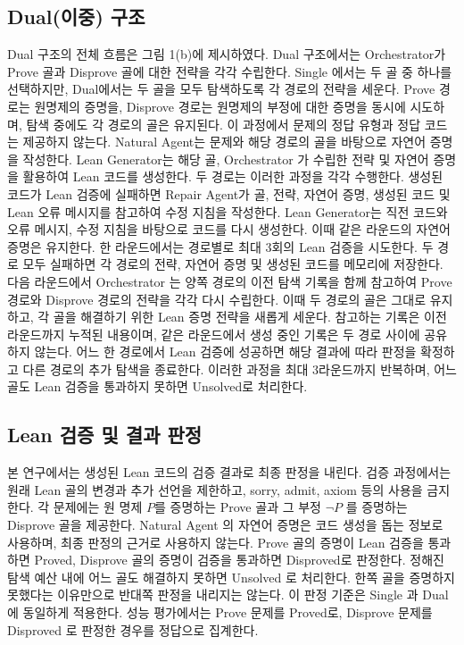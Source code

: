 \documentclass[a4paper,9pt,twocolumn]{extarticle}
\begin{document}
\subsection{Dual(이중) 구조}


Dual 구조의 전체 흐름은 그림 1(b)에 제시하였다. Dual 구조에서는 Orchestrator가 Prove 골과 Disprove 골에 대한 전략을 각각 수립한다. Single 에서는 두 골 중 하나를 선택하지만, Dual에서는 두 골을 모두 탐색하도록 각 경로의 전략을 세운다. Prove 경로는 원명제의 증명을, Disprove 경로는 원명제의 부정에 대한 증명을 동시에 시도하며, 탐색 중에도 각 경로의 골은 유지된다. 이 과정에서 문제의 정답 유형과 정답 코드 는 제공하지 않는다. Natural Agent는 문제와 해당 경로의 골을 바탕으로 자연어 증명을 작성한다. Lean Generator는 해당 골, Orchestrator 가 수립한 전략 및 자연어 증명을 활용하여 Lean 코드를 생성한다. 두 경로는 이러한 과정을 각각 수행한다. 생성된 코드가 Lean 검증에 실패하면 Repair Agent가 골, 전략, 자연어 증명, 생성된 코드 및 Lean 오류 메시지를 참고하여 수정 지침을 작성한다. Lean Generator는 직전 코드와 오류 메시지, 수정 지침을 바탕으로 코드를 다시 생성한다. 이때 같은 라운드의 자연어 증명은 유지한다. 한 라운드에서는 경로별로 최대 3회의 Lean 검증을 시도한다. 두 경로 모두 실패하면 각 경로의 전략, 자연어 증명 및 생성된 코드를 메모리에 저장한다. 다음 라운드에서 Orchestrator 는 양쪽 경로의 이전 탐색 기록을 함께 참고하여 Prove 경로와 Disprove 경로의 전략을 각각 다시 수립한다. 이때 두 경로의 골은 그대로 유지하고, 각 골을 해결하기 위한 Lean 증명 전략을 새롭게 세운다. 참고하는 기록은 이전 라운드까지 누적된 내용이며, 같은 라운드에서 생성 중인 기록은 두 경로 사이에 공유하지 않는다. 어느 한 경로에서 Lean 검증에 성공하면 해당 결과에 따라 판정을 확정하고 다른 경로의 추가 탐색을 종료한다. 이러한 과정을 최대 3라운드까지 반복하며, 어느 골도 Lean 검증을 통과하지 못하면 Unsolved로 처리한다.

\subsection{Lean 검증 및 결과 판정}


본 연구에서는 생성된 Lean 코드의 검증 결과로 최종 판정을 내린다. 검증 과정에서는 원래 Lean 골의 변경과 추가 선언을 제한하고, sorry, admit, axiom 등의 사용을 금지한다. 각 문제에는 원 명제 \(P\)를 증명하는 Prove 골과 그 부정 \(\neg P\) 를 증명하는 Disprove 골을 제공한다. Natural Agent 의 자연어 증명은 코드 생성을 돕는 정보로 사용하며, 최종 판정의 근거로 사용하지 않는다. Prove 골의 증명이 Lean 검증을 통과하면 Proved, Disprove 골의 증명이 검증을 통과하면 Disproved로 판정한다. 정해진 탐색 예산 내에 어느 골도 해결하지 못하면 Unsolved 로 처리한다. 한쪽 골을 증명하지 못했다는 이유만으로 반대쪽 판정을 내리지는 않는다. 이 판정 기준은 Single 과 Dual 에 동일하게 적용한다. 성능 평가에서는 Prove 문제를 Proved로, Disprove 문제를 Disproved 로 판정한 경우를 정답으로 집계한다.
\end{document}
